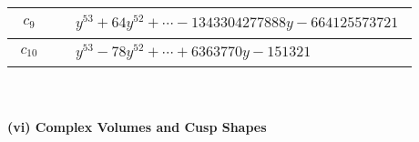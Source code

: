 \documentclass[1p]{elsarticle_modified}
\theoremstyle{definition}
\begin{document}
\begin{tabular}{m{50pt}|m{274pt}}
\hline $$\begin{aligned}c_{9}\end{aligned}$$&$\begin{aligned}
&y^{53}+64 y^{52}+\cdots-1343304277888 y-664125573721
\end{aligned}$\\
\hline $$\begin{aligned}c_{10}\end{aligned}$$&$\begin{aligned}
&y^{53}-78 y^{52}+\cdots+6363770 y-151321
\end{aligned}$\\
\hline
\end{tabular}\\~\\
\newpage\flushleft \textbf{(vi) Complex Volumes and Cusp Shapes}
\end{document}
